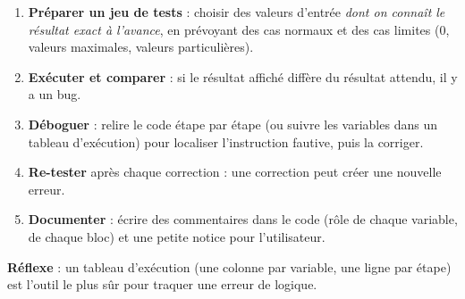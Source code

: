 \documentclass[11pt]{article}
\newcommand{\cle}[1]{{\popxbold\color{popdark}#1}}
\begin{document}
\begin{methode}
\begin{enumerate}
\item \textbf{Préparer un jeu de tests} : choisir des valeurs d'entrée \emph{dont on connaît le résultat exact à l'avance}, en prévoyant des cas normaux et des cas limites (0, valeurs maximales, valeurs particulières).
\item \textbf{Exécuter et comparer} : si le résultat affiché diffère du résultat attendu, il y a un \cle{bug}.
\item \textbf{Déboguer} : relire le code étape par étape (ou suivre les variables dans un tableau d'exécution) pour localiser l'instruction fautive, puis la corriger.
\item \textbf{Re-tester} après chaque correction : une correction peut créer une nouvelle erreur.
\item \textbf{Documenter} : écrire des \cle{commentaires} dans le code (rôle de chaque variable, de chaque bloc) et une petite notice pour l'utilisateur.
\end{enumerate}
\textbf{Réflexe} : un tableau d'exécution (une colonne par variable, une ligne par étape) est l'outil le plus sûr pour traquer une erreur de logique.
\end{methode}
\end{document}
